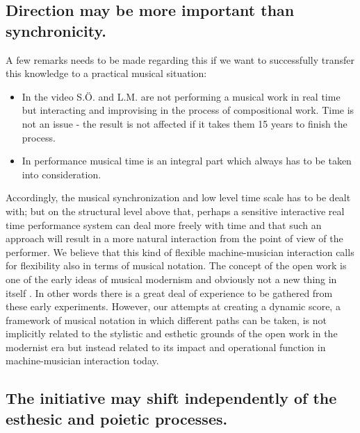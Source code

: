 \documentclass[10pt,letterpaper]{article}
\begin{document}
\subsection{Direction may be more important than synchronicity.}

A few remarks needs to be made regarding this if we want to successfully
transfer this knowledge to a practical musical situation:
\begin{itemize}
 \item In the video S.{\"O}. and L.M. are not performing a musical work in real
       time but interacting and improvising in the process of  compositional
       work. Time is not an issue - the result is not affected
       if it takes them 15 years to finish the process. 
 \item In performance musical time is an integral part which always has
       to be taken into consideration.
\end{itemize}


Accordingly, the musical synchronization and low level time scale has to
be dealt with; but on the structural level above that, perhaps a
sensitive interactive real time performance system can deal more freely
with time 
and that such an approach will result in a more natural interaction from
the point of view of the performer. We believe that this kind of
flexible machine-musician interaction calls for flexibility also in
terms of musical notation. The concept of the open work is one of the
early ideas of musical modernism and obviously not a new thing in itself
\cite{eco68}. In other words there is a great deal of experience to be
gathered from these early experiments. However, our attempts at creating
a dynamic score, a framework of musical notation in which different
paths can be taken, is not implicitly related to the stylistic and
esthetic grounds of the open work in the modernist era but instead
related to its impact and operational function in machine-musician
interaction today.
%

\subsection{The initiative may shift independently of the esthesic and poietic
processes.}
\end{document}

